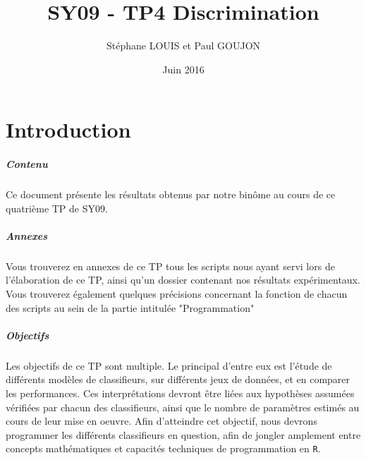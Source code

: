 \documentclass{report}
\begin{document}

\title{SY09 - TP4 Discrimination}
\date{Juin 2016}
\author{Stéphane LOUIS et Paul GOUJON}
\maketitle

\newpage
\tableofcontents{}

\newpage
{}
\chapter{Introduction}

\paragraph{Contenu}
Ce document présente les résultats obtenus par notre binôme au cours de ce quatrième TP de SY09.

\paragraph{Annexes}
Vous trouverez en annexes de ce TP tous les scripts nous ayant servi lors de l'élaboration de ce TP, ainsi qu'un dossier contenant nos résultats expérimentaux. Vous trouverez également quelques précisions concernant la fonction de chacun des scripts au sein de la partie intitulée "Programmation"

\paragraph{Objectifs}
Les objectifs de ce TP sont multiple. Le principal d'entre eux est l'étude de différents modèles de classifieurs, sur différents jeux de données, et en comparer les performances. Ces interprétations devront être liées aux hypothèses assumées vérifiées par chacun des classifieurs, ainsi que le nombre de paramètres estimés au cours de leur mise en oeuvre. Afin d'atteindre cet objectif, nous devrons programmer les différents classifieurs en question, afin de jongler amplement entre concepts mathématiques et capacités techniques de programmation en \verb+R+.
\end{document}
